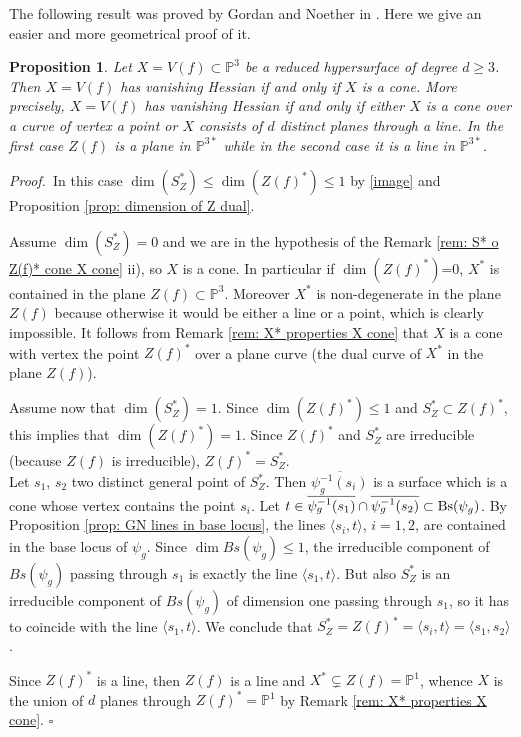 \documentclass[11pt,a4paper]{amsart}
\newtheorem{prop}[theorem]{Proposition}
\newcommand{\bprf}{{\it Proof.~}}
\newcommand{\erem}{\hfill $\square$}
\begin{document}
The following result was proved by Gordan and Noether in
\cite{Gordan Noether}. Here we give an easier and more geometrical
proof of it.
\begin{prop}\label{case n=3}
Let $X=V(f)\subset\mathbb{P}^3$ be a reduced hypersurface of
degree $d\geq 3$. Then $X=V(f)$ has vanishing Hessian if and only
if $X$ is a cone. More precisely, $X=V(f)$ has vanishing Hessian
if and only if either $X$ is a cone over a curve of vertex a point
or $X$ consists of $d$ distinct planes through a line. In the
first case $Z(f)$ is a plane in $\mathbb{P}^{3*}$ while in the
second case it is a line in $\mathbb{P}^{3*}$.
\end{prop}
\bprf In this case $\dim (S^*_Z)\leq\dim (Z(f)^*)\leq 1$  by
\eqref{image} and Proposition \ref{prop: dimension of Z dual}.

Assume $\dim (S^*_Z)=0$ and we are in the hypothesis of the Remark
\ref{rem: S* o Z(f)* cone X cone}  ii), so $X$ is a cone. In
particular if $\dim (Z(f)^*)$=0, $X^*$ is contained in the plane
$Z(f)\subset\mathbb{P}^3$. Moreover $X^*$ is non-degenerate in the
plane $Z(f)$ because otherwise it would be either a line or a
point, which is clearly impossible. It follows from Remark
\ref{rem: X* properties X cone} that $X$ is a cone with vertex the
point $Z(f)^*$ over a plane curve (the dual curve of $X^*$ in the
plane $Z(f)$).

Assume now that $\dim (S^*_Z)=1$. Since $\dim (Z(f)^*)\leq 1$ and
$S^*_Z\subset Z(f)^*$, this implies that $\dim (Z(f)^*)=1$. Since
$Z(f)^*$ and $S^*_Z$ are irreducible (because $Z(f)$ is
irreducible), $Z(f)^*=S^*_Z$.\\ Let ${s_1}$, ${s_2}$ two distinct
general point of $S^*_Z$. Then $\overline{\psi_g^{-1}({s_i})}$ is
a surface which is a cone whose vertex contains the point $s_i$.
Let
${t}\in\overline{\psi_g^{-1}({s_1})}\cap\overline{\psi_g^{-1}({s_2})}\subset
{\rm Bs}(\psi_g)$. By Proposition \ref{prop: GN lines in base
locus},
 the lines $\langle {s_i}, {t}\rangle$,
$i=1,2$, are contained in the base locus of $\psi_g$. Since $\dim
Bs(\psi_g)\leq 1$, the irreducible component of $Bs(\psi_g)$ passing
through ${s_1}$ is exactly the line $\langle
{s_1},{t}\rangle$. But also $S^*_Z$ is an
irreducible component of $Bs(\psi_g)$ of dimension one passing
through ${s_1}$, so it has to coincide with the line
$\langle {s_1}, {t}\rangle$. We conclude that
$S^*_Z=Z(f)^*=\langle {s_i}, {t}\rangle =\langle
{s_1}, {s_2}\rangle$.

Since $Z(f)^*$ is a line, then $Z(f)$ is a line and $X^*\subsetneq
Z(f)=\mathbb{P}^1$, whence $X$ is the union of $d$ planes through
$Z(f)^*=\mathbb{P}^1$ by Remark \ref{rem: X* properties X cone}.
 \erem
\end{document}
